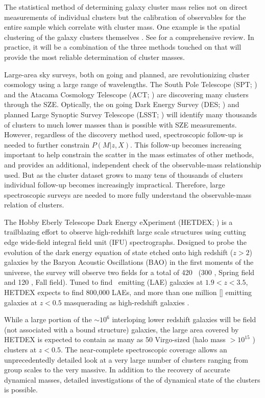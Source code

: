 The statistical method of determining galaxy cluster mass relies not on direct measurements of individual clusters but the calibration of observables for the entire sample which correlate with cluster mass. One example is the spatial clustering of the galaxy clusters themselves . See \cite{Weinberg2013} for a comprehensive review. In practice, it will be a combination of the three methods touched on that will provide the most reliable determination of cluster masses.

Large-area sky surveys, both on going and planned, are revolutionizing cluster cosmology using a large range of wavelengths. The South Pole Telescope (SPT; \citealt{Carlstrom2011}) and the Atacama Cosmology Telescope (ACT; \citealt{Swetz2011}) are discovering many clusters through the SZE. Optically, the on going Dark Energy Survey (DES; \citealt{DES2005}) and planned Large Synoptic Survey Telescope (LSST; \citealt{LSST2012}) will identify many thousands of clusters to much lower masses than is possible with SZE measurements. However, regardless of the discovery method used, spectroscopic follow-up is needed to further constrain $P(M|z,X)$. This follow-up becomes increasing important to help constrain the scatter in the mass estimates of other methods, and provides an additional, independent check of the observable-mass relationship used. But as the cluster dataset grows to many tens of thousands of clusters individual follow-up becomes increasingly impractical. Therefore, large spectroscopic surveys are needed to more fully understand the observable-mass relation of clusters.

The Hobby Eberly Telescope Dark Energy eXperiment (HETDEX; \citealt{Hill2008}) is a trailblazing effort to observe high-redshift large scale structures using cutting edge wide-field integral field unit (IFU) spectrographs. Designed to probe the evolution of the dark energy equation of state etched onto high redshift ($z>2$) galaxies by the Baryon Acoustic Oscillations (BAO) \citep{Eisenstein2005} in the first moments of the universe, the survey will observe two fields for a total of 420 \degsq\ (300 \degsq, Spring field and 120 \degsq, Fall field). Tuned to find \lya\ emitting (LAE) galaxies at $1.9<z<3.5$, HETDEX expects to find 800,000 LAEs, and more than one million \hbox{[]} emitting galaxies at $z<0.5$ masquerading as high-redshift galaxies \citep{Acquaviva2014}. 

While a large portion of the $\sim10^6$ interloping lower redshift galaxies will be field (not associated with a bound structure) galaxies, the large area covered by HETDEX is expected to contain as many as 50 Virgo-sized (halo mass $>10^{15}$ \msol) clusters at $z<0.5$. The near-complete spectroscopic coverage allows an unprecedentedly detailed look at a very large number of clusters ranging from group scales to the very massive. In addition to the recovery of accurate dynamical masses, detailed investigations of the of dynamical state of the clusters is possible. 

